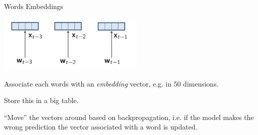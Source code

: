 \documentclass{beamer}
\let\tempone\itemize
\let\temptwo\enditemize
\renewenvironment{itemize}{\tempone\addtolength{\itemsep}{0.5\baselineskip}}{\temptwo}
\newcommand{\boldx}{\mathbf{x}}
\newcommand{\boldb}{\mathbf{b}}
\newcommand{\boldW}{\mathbf{W}}
\begin{document}
\begin{frame}{Words Embeddings}
  \begin{center}
    \includegraphics[width=7cm]{emb}
  \end{center}
  \begin{itemize}
  \item Associate each words with an \textit{embedding} vector, e.g. in 50 dimensions. 
  \item Store this in a big table. 
  \item ``Move'' the vectors around based on backpropagation, i.e. if the model 
    makes the wrong prediction the vector associated with a word is updated.
  \end{itemize}
\end{frame}



  














  
\end{document}
